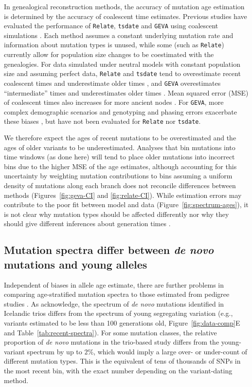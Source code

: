 \documentclass[]{article}
\newcommand{\GEVA}{\texttt{GEVA}\xspace}
\newcommand{\tsdate}{\texttt{tsdate}\xspace}
\newcommand{\relate}{\texttt{Relate}\xspace}
\begin{document}
In genealogical reconstruction methods, the accuracy of mutation age estimation
is determined by the accuracy of coalescent time estimates. Previous studies
have evaluated the performance of \relate, \tsdate and \GEVA using coalescent
simulations \citep{brandt2022evaluation,albers2020dating}. Each method assumes
a constant underlying mutation rate and information about mutation types is
unused, while some (such as \relate) currently allow for population size
changes to be coestimated with the genealogies. For data simulated under
neutral models with constant population size and assuming perfect data, \relate
and \tsdate tend to overestimate recent coalescent times and underestimate
older times \citep{brandt2022evaluation}, and \GEVA overestimates
``intermediate'' times and underestimates older times \citep{albers2020dating}.
Mean squared error (MSE) of coalescent times also increases for more ancient
nodes \citep{brandt2022evaluation}. For \GEVA, more complex demographic
scenarios and genotyping and phasing errors exacerbate these biases
\cite{albers2020dating}, but have not been evaluated for \relate nor \tsdate.

We therefore expect the ages of recent mutations to be overestimated and the
ages of older variants to be underestimated. Analyses that bin mutations into
time windows (as done here) will tend to place older mutations into incorrect
bins due to the higher MSE of the age estimates, although accounting for this
uncertainty by weighting mutation contributions to bins assuming a uniform
density of mutations along each branch does not reconcile differences between
methods (Figures~\ref{fig:geva-CI} and \ref{fig:relate-CI}). While estimation
errors may contribute to the poor fit between model and data
(Figure~\ref{fig:spectrum-ages}), it is not clear why mutation types should be
affected differently nor why they should give different inferences about
generation times \citep{gao2023limited}.

\subsection*{Mutation spectra differ between \emph{de novo} mutations and young
alleles}

Independent of biases in allele age estimate, there are further problems in
comparing age-stratified mutation spectra to those estimated from pedigree
studies \citep{jonsson2017parental,halldorsson2019characterizing}. As
\citet{wang2023human} acknowledge, the spectrum of \emph{de novo} mutations
identified in Icelandic trios \citep{jonsson2017parental} differs from the
spectrum of young segregating variation (e.g., variants estimated to be less
    than 100 generations old, Figure~\ref{fig:data-comp}E and
Table~\ref{tab:recent-spectra}). 
For some mutation classes, the relative proportion of \emph{de novo} mutations
in the trio-based study differs from the young-variant spectrum by up to
$2\%$, which would imply a large over- or under-count of different mutation
types. This is the equivalent of tens of thousands of SNPs in the most recent
bin, with the exact number depending on the variant-dating method.
\end{document}
